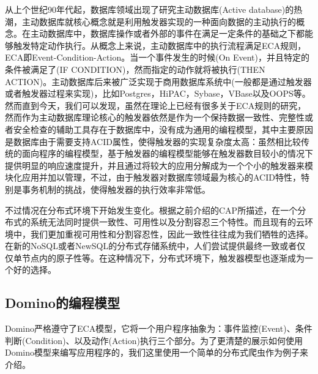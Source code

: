 从上个世纪90年代起，数据库领域出现了研究主动数据库(Active database\cite{rabuzin2007theory,mccarthy1989architecture, jaeger1999parallel, gehani1991ode,dayal1988hipac,chakravarthy1994composite})的热潮，主动数据库就核心概念就是利用触发器实现的一种面向数据的主动执行的概念。在主动数据库中，数据库操作或者外部的事件在满足一定条件的基础之下都能够触发特定动作执行。从概念上来说，主动数据库中的执行流程满足ECA规则，ECA即Event-Condition-Action。当一个事件发生的时候(On Event)，并且特定的条件被满足了(IF CONDITION)，然而指定的动作就将被执行(THEN ACTION)。主动数据库后来被广泛实现于商用数据库系统中(一般都是通过触发器或者触发器过程来实现)，比如Postgres\cite{stonebraker1988postgres}，HiPAC\cite{dayal1988hipac}，Sybase\cite{darnovsky1987transact}，VBase\cite{andrews1987combining}以及OOPS\cite{schlageter1988oops}等。然而直到今天，我们可以发现，虽然在理论上已经有很多关于ECA规则的研究，然而作为主动数据库理论核心的触发器依然是作为一个保持数据一致性、完整性或者安全检查的辅助工具存在于数据库中，没有成为通用的编程模型，其中主要原因是数据库由于需要支持ACID属性，使得触发器的实现复杂度太高：虽然相比较传统的面向程序的编程模型，基于触发器的编程模型能够在触发器数目较小的情况下提供明显的响应速度提升，并且通过将较大的应用分解成为一个个小的触发器来模块化应用并加以管理，不过，由于触发器对数据库领域最为核心的ACID特性，特别是事务机制的挑战，使得触发器的执行效率非常低。

不过情况在分布式环境下开始发生变化。根据之前介绍的CAP所描述，在一个分布式的系统无法同时提供一致性、可用性以及分割容忍三个特性。而且现有的云环境中，我们更加重视可用性和分割容忍性，因此一致性往往成为我们牺牲的选择。在新的NoSQL或者NewSQL的分布式存储系统中，人们尝试提供最终一致或者仅仅单节点内的原子性等。在这种情况下，分布式环境下，触发器模型也逐渐成为一个好的选择。

\subsection{Domino的编程模型}
Domino严格遵守了ECA模型，它将一个用户程序抽象为：事件监控(Event)、条件判断(Condition)、以及动作(Action)执行三个部分。为了更清楚的展示如何使用Domino模型来编写应用程序的，我们这里使用一个简单的分布式爬虫作为例子来介绍。

